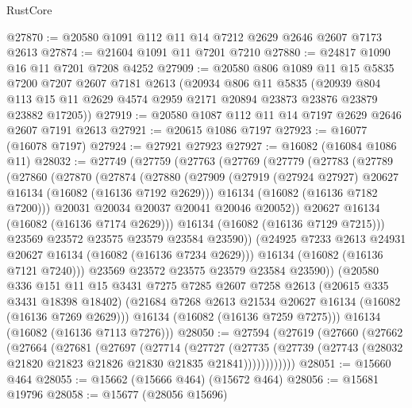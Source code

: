 \begin{lexlean}{RustCore}
\begin{coremodule}
@27870 := @20580 @1091 @112 @11 @14 @7212 @2629 @2646 @2607 @7173 @2613
@27874 := @21604 @1091 @11 @7201 @7210
@27880 := @24817 @1090 @16 @11 @7201 @7208 @4252
@27909 := @20580
    @806
    @1089
    @11
    @15
    @5835
    @7200
    @7207
    @2607
    @7181
    @2613
    (@20934
      @806
      @11
      @5835
      (@20939 @804 @113 @15 @11 @2629 @4574 @2959 @2171 @20894 @23873 @23876 @23879 @23882 @17205))
@27919 := @20580 @1087 @112 @11 @14 @7197 @2629 @2646 @2607 @7191 @2613
@27921 := @20615 @1086 @7197
@27923 := @16077 (@16078 @7197)
@27924 := @27921 @27923
@27927 := @16082 (@16084 @1086 @11)
@28032 := @27749
    (@27759
      (@27763
        (@27769
          (@27779
            (@27783
              (@27789
                (@27860
                  (@27870
                    (@27874
                      (@27880
                        (@27909
                          (@27919 (@27924 @27927) @20627 @16134 (@16082 (@16136 @7192 @2629)))
                          @16134
                          (@16082 (@16136 @7182 @7200)))
                        @20031
                        @20034
                        @20037
                        @20041
                        @20046
                        @20052))
                    @20627
                    @16134
                    (@16082 (@16136 @7174 @2629)))
                  @16134
                  (@16082 (@16136 @7129 @7215)))
                @23569
                @23572
                @23575
                @23579
                @23584
                @23590))
            (@24925 @7233 @2613 @24931 @20627 @16134 (@16082 (@16136 @7234 @2629)))
            @16134
            (@16082 (@16136 @7121 @7240)))
          @23569
          @23572
          @23575
          @23579
          @23584
          @23590))
      (@20580
        @336
        @151
        @11
        @15
        @3431
        @7275
        @7285
        @2607
        @7258
        @2613
        (@20615 @335 @3431 @18398 @18402)
        (@21684 @7268 @2613 @21534 @20627 @16134 (@16082 (@16136 @7269 @2629)))
        @16134
        (@16082 (@16136 @7259 @7275)))
      @16134
      (@16082 (@16136 @7113 @7276)))
@28050 := @27594
    (@27619
      (@27660
        (@27662
          (@27664
            (@27681
              (@27697
                (@27714
                  (@27727
                    (@27735
                      (@27739 (@27743 (@28032 @21820 @21823 @21826 @21830 @21835 @21841))))))))))))
@28051 := @15660 @464
@28055 := @15662 (@15666 @464) (@15672 @464)
@28056 := @15681 @19796
@28058 := @15677 (@28056 @15696)

\end{coremodule}
\end{lexlean}
